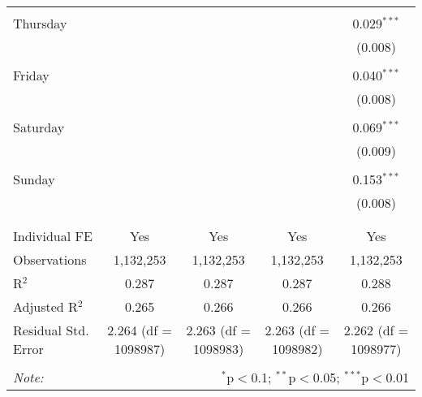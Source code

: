 \documentclass[
]{article}
\begin{document}
\begin{table}[!htbp]
{\begin{tabular}{@{\extracolsep{5pt}}lcccc}
  & & & & \\ 
 Thursday &  &  &  & 0.029$^{***}$ \\ 
  &  &  &  & (0.008) \\ 
  & & & & \\ 
 Friday &  &  &  & 0.040$^{***}$ \\ 
  &  &  &  & (0.008) \\ 
  & & & & \\ 
 Saturday &  &  &  & 0.069$^{***}$ \\ 
  &  &  &  & (0.009) \\ 
  & & & & \\ 
 Sunday &  &  &  & 0.153$^{***}$ \\ 
  &  &  &  & (0.008) \\ 
  & & & & \\ 
\hline \\[-1.8ex] 
Individual FE & Yes & Yes & Yes & Yes \\ 
Observations & 1,132,253 & 1,132,253 & 1,132,253 & 1,132,253 \\ 
R$^{2}$ & 0.287 & 0.287 & 0.287 & 0.288 \\ 
Adjusted R$^{2}$ & 0.265 & 0.266 & 0.266 & 0.266 \\ 
Residual Std. Error & 2.264 (df = 1098987) & 2.263 (df = 1098983) & 2.263 (df = 1098982) & 2.262 (df = 1098977) \\ 
\hline 
\hline \\[-1.8ex] 
\textit{Note:}  & \multicolumn{4}{r}{$^{*}$p$<$0.1; $^{**}$p$<$0.05; $^{***}$p$<$0.01} \\ 
\end{tabular}
} 
\end{table} 
\newpage
\end{document}
